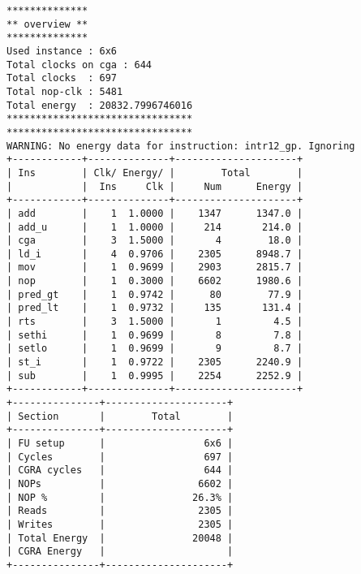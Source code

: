 \documentclass[oneside,11pt,accentcolor=tud2b, nochapname]{tudexercise}
\begin{document}
\begin{lstlisting}[caption={Endausgabe für das Ziel Performance-Max (Instanz 6x6) },captionpos=b, float, label={lst:performance}]
**************
** overview **
**************
Used instance : 6x6
Total clocks on cga : 644
Total clocks  : 697
Total nop-clk : 5481 
Total energy  : 20832.7996746016
********************************
********************************
WARNING: No energy data for instruction: intr12_gp. Ignoring
+------------+--------------+---------------------+
| Ins        | Clk/ Energy/ |        Total        |
|            |  Ins     Clk |     Num      Energy |
+------------+--------------+---------------------+
| add        |    1  1.0000 |    1347      1347.0 |
| add_u      |    1  1.0000 |     214       214.0 |
| cga        |    3  1.5000 |       4        18.0 |
| ld_i       |    4  0.9706 |    2305      8948.7 |
| mov        |    1  0.9699 |    2903      2815.7 |
| nop        |    1  0.3000 |    6602      1980.6 |
| pred_gt    |    1  0.9742 |      80        77.9 |
| pred_lt    |    1  0.9732 |     135       131.4 |
| rts        |    3  1.5000 |       1         4.5 |
| sethi      |    1  0.9699 |       8         7.8 |
| setlo      |    1  0.9699 |       9         8.7 |
| st_i       |    1  0.9722 |    2305      2240.9 |
| sub        |    1  0.9995 |    2254      2252.9 |
+------------+--------------+---------------------+
+---------------+---------------------+
| Section       |        Total        |
+---------------+---------------------+
| FU setup      |                 6x6 |
| Cycles        |                 697 |
| CGRA cycles   |                 644 |
| NOPs          |                6602 |
| NOP %         |               26.3% |
| Reads         |                2305 |
| Writes        |                2305 |
| Total Energy  |               20048 |
| CGRA Energy   |                     |
+---------------+---------------------+
\end{lstlisting}
\end{document}
